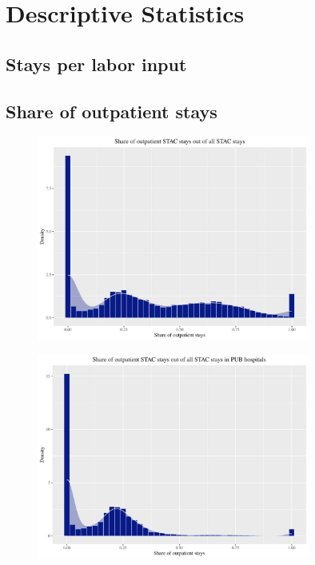 \section{Descriptive Statistics}
\subsection{Stays per labor input}










\clearpage
\subsection{Share of outpatient stays}
\begin{figure}[!htb]
    \centering
    \includegraphics[width=0.8\textwidth]{../../Figures/2016-2022/STAC_share_pool.pdf}
\end{figure}

\bigskip
\begin{figure}[!htb]
    \centering
    \includegraphics[width=0.8\textwidth]{../../Figures/2016-2022/STAC_share_PUB.pdf}
\end{figure}

